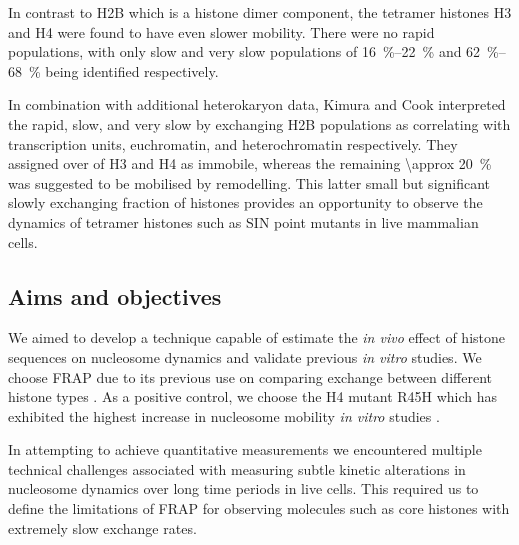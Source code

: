     In contrast to H2B which is a histone dimer component, the tetramer
    histones H3 and H4 were found to have even slower mobility.  There
    were no rapid populations, with only slow and very slow populations
    of \SIrange{16}{22}{\percent} and \SIrange{62}{68}{\percent} being
    identified respectively.

    In combination with additional heterokaryon data, Kimura and Cook
    interpreted the rapid, slow, and very slow by exchanging H2B
    populations as correlating with transcription units, euchromatin,
    and heterochromatin respectively.  They assigned over 
    of H3 and H4 as immobile, whereas the remaining
    \SI{\approx 20}{\percent} was suggested to be mobilised by
    remodelling.  This latter small but significant
    slowly exchanging fraction of histones
    provides an opportunity to observe the dynamics of
    tetramer histones such as SIN point mutants in live mammalian cells.


  \subsection{Aims and objectives}

    We aimed to develop a technique capable of estimate the \textit{in
      vivo} effect of histone sequences on nucleosome dynamics and
    validate previous \textit{in vitro} studies.  We choose FRAP
    due to its previous use on comparing exchange between different
    histone types \citep{KimuraCook}.  As a positive control, we
    choose the H4 mutant R45H which has exhibited the highest
    increase in nucleosome mobility \textit{in vitro} studies
    \citep{flaus2004sin}.

    In attempting to achieve quantitative measurements
    we encountered multiple technical challenges associated with
    measuring subtle kinetic alterations in nucleosome dynamics
    over long time periods in live cells.
    This required us to define the limitations of FRAP for observing molecules
    such as core histones with extremely slow exchange rates.
